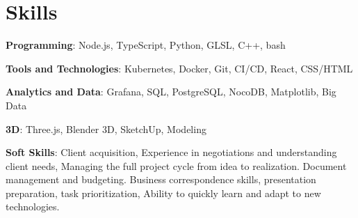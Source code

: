 \documentclass[letterpaper,9pt]{article}
\begin{document}
\section{Skills}
\begin{itemize}[leftmargin=0.15in, label={}]
\small{\item{
\textbf{Programming}{: Node.js, TypeScript, Python, GLSL, C++, bash}}}
\small{\item{
\textbf{Tools and Technologies}{: Kubernetes, Docker, Git, CI/CD, React, CSS/HTML}}}
\small{\item{
\textbf{Analytics and Data}{: Grafana, SQL, PostgreSQL, NocoDB, Matplotlib, Big Data}}}
\small{\item{
\textbf{3D}{: Three.js, Blender 3D, SketchUp, Modeling}}}
\small{\item{
\textbf{Soft Skills}{: Client acquisition, Experience in negotiations and understanding client needs, Managing the full project cycle from idea to realization. Document management and budgeting. Business correspondence skills, presentation preparation, task prioritization, Ability to quickly learn and adapt to new technologies.}}}
\end{itemize}
\end{document}
